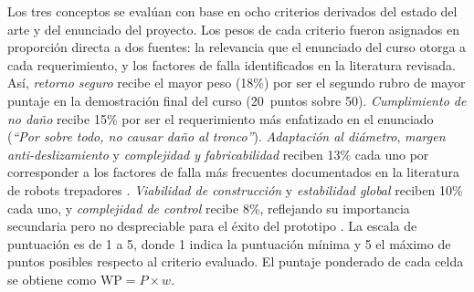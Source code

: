 \documentclass[lettersize,journal]{IEEEtran}
\begin{document}
Los tres conceptos se evalúan con base en ocho criterios derivados del estado del
arte y del enunciado del proyecto. Los pesos de cada criterio fueron asignados en
proporción directa a dos fuentes: la relevancia que el enunciado del curso otorga a
cada requerimiento, y los factores de falla identificados en la literatura revisada.
Así, \emph{retorno seguro} recibe el mayor peso (18\%) por ser el segundo rubro de
mayor puntaje en la demostración final del curso (20~puntos sobre 50). \emph{Cumplimiento
de no daño} recibe 15\% por ser el requerimiento más enfatizado en el enunciado
(\emph{``Por sobre todo, no causar daño al tronco''}). \emph{Adaptación al diámetro},
\emph{margen anti-deslizamiento} y \emph{complejidad y fabricabilidad} reciben 13\%
cada uno por corresponder a los factores de falla más frecuentes documentados en la
literatura de robots trepadores \cite{GuiTangMukhopadhyay2018, Amaran2021,
KaiserEtAl2024ElastomerFriction}. \emph{Viabilidad de construcción} y
\emph{estabilidad global} reciben 10\% cada uno, y \emph{complejidad de control}
recibe 8\%, reflejando su importancia secundaria pero no despreciable para el éxito
del prototipo \cite{UlrichEppinger2012}. La escala de puntuación es de 1 a 5, donde
1 indica la puntuación mínima y 5 el máximo de puntos posibles respecto al criterio
evaluado. El puntaje ponderado de cada celda se obtiene como $\text{WP} = P \times w$.
\end{document}
